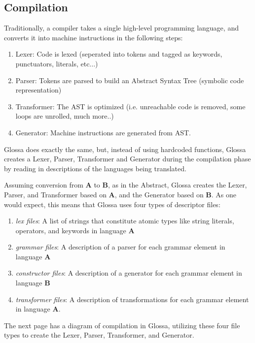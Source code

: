 \documentclass{article}
\begin{document}
\subsection{Compilation}
Traditionally, a compiler takes a single high-level programming language, and converts it into machine instructions in the following steps:
\begin{enumerate}
\item Lexer: Code is lexed (seperated into tokens and tagged as keywords, punctuators, literals, etc...)
\item Parser: Tokens are parsed to build an Abstract Syntax Tree (symbolic code representation)
\item Transformer: The AST is optimized (i.e. unreachable code is removed, some loops are unrolled, much more..)
\item Generator: Machine instructions are generated from AST.
\end{enumerate}

Glossa does exactly the same, but, instead of using hardcoded functions, Glossa creates a Lexer, Parser, Transformer and Generator during the compilation phase by reading in descriptions of the languages being translated.

Assuming conversion from \textbf{A} to \textbf{B}, as in the Abstract, Glossa creates the Lexer, Parser, and Transformer based on \textbf{A}, and the Generator based on \textbf{B}.
As one would expect, this means that Glossa uses four types of descriptor files:

\begin{enumerate}
    \item \textit{lex files}: A list of strings that constitute atomic types like string literals, operators, and keywords in language \textbf{A} 
    \item \textit{grammar files}: A description of a parser for each grammar element in language \textbf{A} 
    \item \textit{constructor files}: A description of a generator for each grammar element in language \textbf{B}
    \item \textit{transformer files}: A description of transformations for each grammar element in language \textbf{A}.
\end{enumerate}

The next page has a diagram of compilation in Glossa, utilizing these four file types to create the Lexer, Parser, Transformer, and Generator.

\newpage
\end{document}

